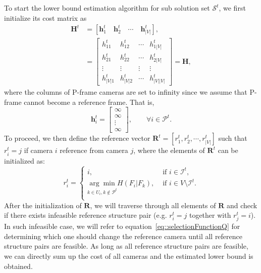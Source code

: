 To start the lower bound estimation algorithm for sub solution set $\mathcal{S}^t$, we first initialize its cost matrix as
\begin{align}
\mathbf{H}^t
&= \left[ \mathbf{h}_1^t \quad \mathbf{h}_2^t \quad \cdots \quad \mathbf{h}_{|V|}^t \right], \nonumber \\
&= \left[ \begin{array}{cccc}
h_{11}^t &h_{12}^t &\cdots &h_{1|V|}^t \\
h_{21}^t &h_{22}^t &\cdots &h_{2|V|}^t \\
\vdots &\vdots &\vdots &\vdots \\
h_{|V|1}^t &h_{|V|2}^t &\cdots &h_{|V||V|}^t
\end{array} \right]
= \mathbf{H},
\label{eq::modBBcostMatrix}
\end{align}
where the columns of P-frame cameras are set to infinity since we assume that P-frame cannot become a reference frame.
That is,
\begin{equation}
\mathbf{h}^t_i = \left[ \begin{array}{c}
\infty \\
\infty \\
\vdots \\
\infty
\end{array} \right],
\quad \quad \forall i \in \mathcal{P}^t.
\label{eq::infColumn}
\end{equation}
To proceed, we then define the reference vector ${\mathbf{R}^t = [r_1^t,r_2^t,\cdots,r_{|V|}^t]}$ such that $r_i^t = j$ if camera $i$ reference from camera $j$, where the elements of $\mathbf{R}^t$ can be initialized as:
\begin{equation}
r_i^t = 
\left\{ \begin{array}{cc}
i,  &\text{ if $i \in \mathcal{I}^t$,} \\                  	   
\underset{k \in U_i, k \notin \mathcal{P}^t}{\arg\min} H(F_i|F_k),  &\text{ if $i \in V\setminus \mathcal{I}^t$.} \\
\end{array} \right.
\label{eq::initRefStructure}
\end{equation}
After the initialization of $\mathbf{R}$, we will traverse through all elements of $\mathbf{R}$ and check if there exists infeasible reference structure pair (e.g. $r_i^t = j$ together with $r_j^t=i$).
In such infeasible case, we will refer to equation~\eqref{eq::selectionFunctionQ} for determining which one should change the reference camera until all reference structure pairs are feasible.
As long as all reference structure pairs are feasible, we can directly sum up the cost of all cameras and the estimated lower bound is obtained.

